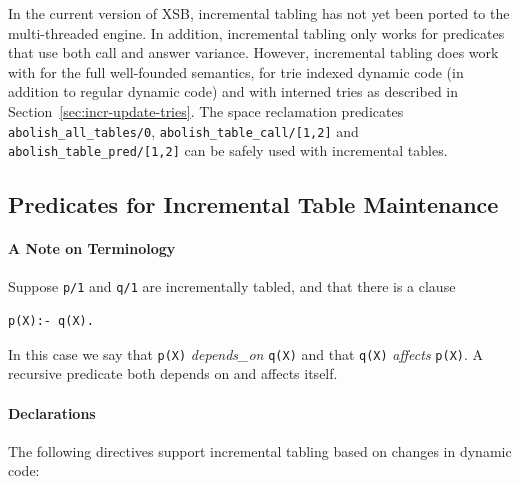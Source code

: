 In the current version of XSB, incremental tabling has not yet been
ported to the multi-threaded engine.  In addition, incremental tabling
only works for predicates that use both call and answer variance.
However, incremental tabling does work with for the full well-founded
semantics, for trie indexed dynamic code (in addition to regular
dynamic code) and with interned tries as described in
Section~\ref{sec:incr-update-tries}.  The space reclamation predicates
{\tt abolish\_all\_tables/0}, {\tt abolish\_table\_call/[1,2]} and
{\tt abolish\_table\_pred/[1,2]} can be safely used with incremental
tables.

\subsection{Predicates for Incremental Table Maintenance} \label{sec:incr-preds1}

\paragraph{A Note on Terminology}
%
Suppose {\tt p/1} and {\tt q/1} are incrementally tabled, and that
there is a clause
%
\begin{verbatim}
p(X):- q(X).
\end{verbatim}
%
In this case we say that {\tt p(X)} {\em depends\_on} {\tt q(X)} and
that {\tt q(X)} {\em affects} {\tt p(X)}.  A recursive predicate both
depends on and affects itself.


\paragraph{Declarations} The following directives support incremental
tabling based on changes in dynamic code: 

